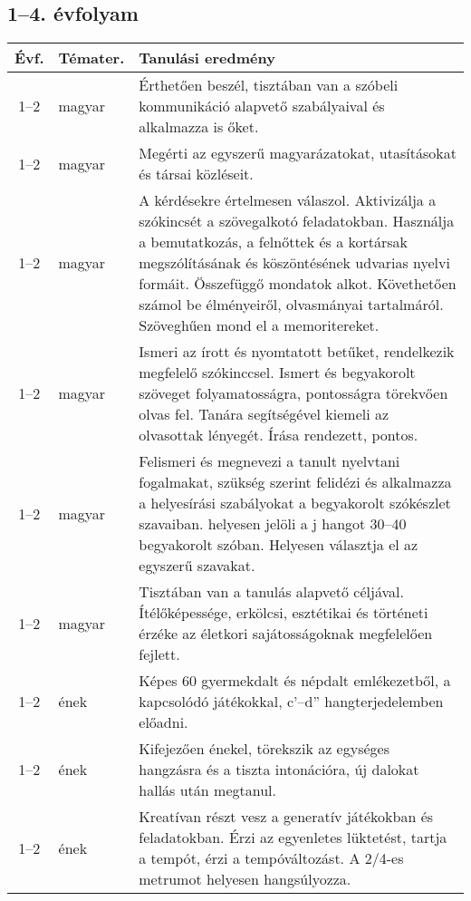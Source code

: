 \subsection{1--4. évfolyam}
\begin{small}
  \begin{longtable}{c | p{2cm} |  p{11cm} }
    \textbf{Évf.} & \textbf{Témater.} & \textbf{Tanulási eredmény} \\ \hline \hline
    \endhead

              1--2 & magyar & Érthetően beszél, tisztában van a szóbeli kommunikáció alapvető szabályaival és alkalmazza is őket. \\ \hline
              1--2 & magyar & Megérti az egyszerű magyarázatokat, utasításokat és társai közléseit. \\ \hline
              1--2 & magyar & A kérdésekre értelmesen válaszol. Aktivizálja a szókincsét a szövegalkotó feladatokban. Használja a bemutatkozás, a felnőttek és a kortársak megszólításának és köszöntésének udvarias nyelvi formáit. Összefüggő mondatok alkot. Követhetően számol be élményeiről, olvasmányai tartalmáról. Szöveghűen mond el a memoritereket. \\ \hline
              1--2 & magyar & Ismeri az írott és nyomtatott betűket, rendelkezik megfelelő szókinccsel. Ismert és begyakorolt szöveget folyamatosságra, pontosságra törekvően olvas fel. Tanára segítségével kiemeli az olvasottak lényegét. Írása rendezett, pontos. \\ \hline
              1--2 & magyar & Felismeri és megnevezi a tanult nyelvtani fogalmakat, szükség szerint felidézi és alkalmazza a helyesírási szabályokat a begyakorolt szókészlet szavaiban. helyesen jelöli a j hangot 30–40 begyakorolt szóban. Helyesen választja el az egyszerű szavakat. \\ \hline
              1--2 & magyar & Tisztában van a tanulás alapvető céljával. Ítélőképessége, erkölcsi, esztétikai és történeti érzéke az életkori sajátosságoknak megfelelően fejlett. \\ \hline
              1--2 & ének & Képes 60 gyermekdalt és népdalt emlékezetből, a kapcsolódó játékokkal, c’–d” hangterjedelemben előadni. \\ \hline
              1--2 & ének & Kifejezően énekel, törekszik az egységes hangzásra és a tiszta intonációra, új dalokat hallás után megtanul. \\ \hline
              1--2 & ének & Kreatívan részt vesz a generatív játékokban és feladatokban. Érzi az egyenletes lüktetést, tartja a tempót, érzi a tempóváltozást. A 2/4-es metrumot helyesen hangsúlyozza. \\ \hline

\end{longtable}
\end{small}
